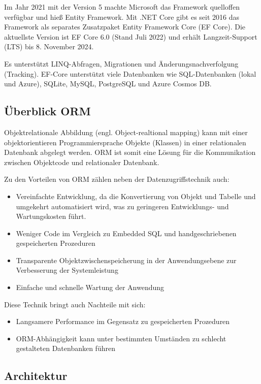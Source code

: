 Im Jahr 2021 mit der Version 5 machte Microsoft das Framework quelloffen verfügbar und hieß
Entity Framework. Mit .NET Core gibt es seit 2016 das Framework als separates Zusatzpaket Entity
Framework Core (EF Core). Die aktuellste Version ist EF Core 6.0 (Stand Juli 2022) und 
erhält Langzeit-Support (LTS) bis 8. November 2024.

Es unterstützt LINQ-Abfragen, Migrationen und Änderungsnachverfolgung (Tracking). EF-Core
unterstützt viele Datenbanken wie SQL-Datenbanken (lokal und Azure), SQLite, MySQL, PostgreSQL
und Azure Cosmos DB.

\subsection{Überblick ORM}
Objektrelationale Abbildung (engl. Object-realtional mapping) kann mit einer objektorientieren
Programmiersprache Objekte (Klassen) in einer relationalen Datenbank abgelegt werden. ORM ist
somit eine Lösung für die Kommunikation zwischen Objektcode und relationaler Datenbank.

Zu den Vorteilen von ORM zählen neben der Datenzugriffstechnik auch:

\begin{itemize}
    \item Vereinfachte Entwicklung, da die Konvertierung von Objekt und Tabelle und umgekehrt
    automatisiert wird, was zu geringeren Entwicklungs- und Wartungskosten führt.
    \item Weniger Code im Vergleich zu Embedded SQL und handgeschriebenen gespeicherten
    Prozeduren
    \item Transparente Objektzwischenspeicherung in der Anwendungsebene zur Verbesserung der
    Systemleistung
    \item Einfache und schnelle Wartung der Anwendung
\end{itemize}

Diese Technik bringt auch Nachteile mit sich:

\begin{itemize}
    \item Langsamere Performance im Gegensatz zu gespeicherten Prozeduren
    \item ORM-Abhängigkeit kann unter bestimmten Umständen zu schlecht gestalteten
    Datenbanken führen
\end{itemize}

\subsection{Architektur}

